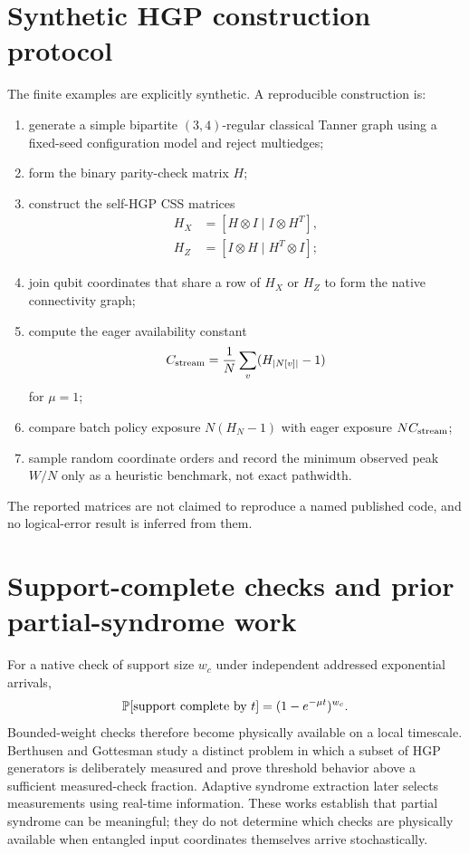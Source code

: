 \documentclass[aps,prx,preprint,superscriptaddress,nofootinbib,longbibliography]{revtex4-2}
\begin{document}
\section{Synthetic HGP construction protocol}
The finite examples are explicitly synthetic. A reproducible construction is:
\begin{enumerate}
\item generate a simple bipartite $(3,4)$-regular classical Tanner graph using a fixed-seed configuration model and reject multiedges;
\item form the binary parity-check matrix $H$;
\item construct the self-HGP CSS matrices
\begin{align}
H_X&=[H\otimes I\;|\;I\otimes H^T],\\
H_Z&=[I\otimes H\;|\;H^T\otimes I];
\end{align}
\item join qubit coordinates that share a row of $H_X$ or $H_Z$ to form the native connectivity graph;
\item compute the eager availability constant
\begin{equation}
C_{\rm stream}=\frac1N\sum_v(H_{|N[v]|}-1)
\end{equation}
for $\mu=1$;
\item compare batch policy exposure $N(H_N-1)$ with eager exposure $NC_{\rm stream}$;
\item sample random coordinate orders and record the minimum observed peak $W/N$ only as a heuristic benchmark, not exact pathwidth.
\end{enumerate}
The reported matrices are not claimed to reproduce a named published code, and no logical-error result is inferred from them.

\section{Support-complete checks and prior partial-syndrome work}
For a native check of support size $w_c$ under independent addressed exponential arrivals,
\begin{equation}
\mathbb P[\text{support complete by }t]=(1-e^{-\mu t})^{w_c}.
\end{equation}
Bounded-weight checks therefore become physically available on a local timescale. Berthusen and Gottesman study a distinct problem in which a subset of HGP generators is deliberately measured and prove threshold behavior above a sufficient measured-check fraction. Adaptive syndrome extraction later selects measurements using real-time information. These works establish that partial syndrome can be meaningful; they do not determine which checks are physically available when entangled input coordinates themselves arrive stochastically.
\end{document}
